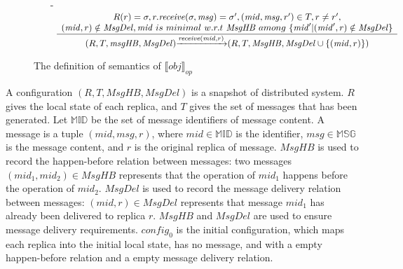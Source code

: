 \begin{figure}[ht]
\begin{itemize}
\item[-] $\begin{array}{l c}
   \bigfrac{
   \begin{array}{c}
      R(r) = \sigma, r.\mathit{receive}(\sigma,\mathit{msg}) = \sigma', (\mathit{mid},\mathit{msg},r') \in T, r \neq r', \\
      (\mathit{mid},r) \notin \mathit{MsgDel}, \mathit{mid} \ is \ minimal \ w.r.t \ \mathit{MsgHB} \ among \ \{ \mathit{mid}' \vert (\mathit{mid}',r) \notin \mathit{MsgDel} \}
   \end{array}}
     {(R,T,\mathit{msgHB},\mathit{MsgDel}) {\xrightarrow{\mathit{receive}(\mathit{mid},r)}} (R,T,\mathit{MsgHB},\mathit{MsgDel} \cup \{ (\mathit{mid},r) \} )}
\end{array}$
\end{itemize}
\caption{The definition of semantics of $\llbracket \mathit{obj} \rrbracket_{\mathit{op}}$}
\label{fig:the semantics of a operation-based CRDT object}
\end{figure}

A configuration $(R,T,\mathit{MsgHB},\mathit{MsgDel})$ is a snapshot of distributed system. $R$ gives the local state of each replica, and $T$ gives the set of messages that has been generated. Let $\mathbb{MID}$ be the set of message identifiers of message content. A message is a tuple $(\mathit{mid},\mathit{msg},r)$, where $\mathit{mid} \in \mathbb{MID}$ is the identifier, $\mathit{msg} \in \mathbb{MSG}$ is the message content, and $r$ is the original replica of message. $\mathit{MsgHB}$ is used to record the happen-before relation between messages: two messages $(\mathit{mid}_1,\mathit{mid}_2) \in \mathit{MsgHB}$ represents that the operation of $\mathit{mid}_1$ happens before the operation of $\mathit{mid}_2$. $\mathit{MsgDel}$ is used to record the message delivery relation between messages: $(\mathit{mid},r) \in \mathit{MsgDel}$ represents that message $\mathit{mid}_1$ has already been delivered to replica $r$. $\mathit{MsgHB}$ and $\mathit{MsgDel}$ are used to ensure message delivery requirements. $\mathit{config}_0$ is the initial configuration, which maps each replica into the initial local state, has no message, and with a empty happen-before relation and a empty message delivery relation.


